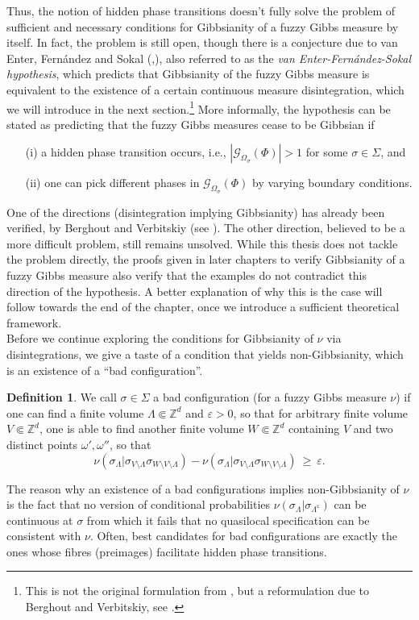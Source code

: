 \documentclass[12pt]{article}
\newcommand{\G}{\mathcal{G}}
\newcommand{\Z}{\mathbb{Z}}
\newcommand{\1}{\mathbbm{1}}
\renewcommand{\c}{\mathsf{c}}
\newcommand{\5}{\vspace{0.5cm}}
\theoremstyle{definition}
\newtheorem{df}[thm]{Definition}
\begin{document}
Thus, the notion of hidden phase transitions doesn't fully solve the problem of sufficient and necessary conditions for Gibbsianity of a fuzzy Gibbs measure by itself. In fact, the problem is still open, though there is a conjecture due to van Enter, Fern\'andez and Sokal (\cite{EFS},\cite{Ber}), also referred to as the \textit{van Enter-Fern\'andez-Sokal hypothesis}, which predicts that Gibbsianity of the fuzzy Gibbs measure is equivalent to the existence of a certain continuous measure disintegration, which we will introduce in the next section.\footnote{This is not the original formulation from \cite{EFS}, but a reformulation due to Berghout and Verbitskiy, see \cite{Ber}.}  More informally, the hypothesis can be stated as predicting that the fuzzy Gibbs measures cease to be Gibbsian if 
\begin{itemize}
	\item[(i)] a hidden phase transition occurs, i.e., $|\G_{\Omega_\sigma}(\Phi)|>1$ for some $\sigma\in\Sigma$, and
	\item[(ii)]  one can pick different phases in $\G_{\Omega_\sigma}(\Phi)$ by varying boundary conditions.
\end{itemize}
One of the directions (disintegration implying Gibbsianity) has already been verified, by Berghout and Verbitskiy (see \cite{Ber}). The other direction, believed to be a more difficult problem, still remains unsolved. While this thesis does not tackle the problem directly, the proofs given in later chapters to verify Gibbsianity of a fuzzy Gibbs measure also verify that the examples do not contradict this direction of the hypothesis. A better explanation of why this is the case will follow towards the end of the chapter, once we introduce a sufficient theoretical framework. \\

Before we continue exploring the conditions for Gibbsianity of $\nu$ via disintegrations, we give a taste of a condition that yields non-Gibbsianity, which is an existence of a ``bad configuration''.

\begin{df}
We call $\sigma\in\Sigma$ a bad configuration (for a fuzzy Gibbs measure $\nu$) if one can find a finite volume $\Lambda\Subset\Z^d$ and $\varepsilon>0$, so that for arbitrary finite volume $V\Subset\Z^d$, one is able to find another finite volume $W\Subset\Z^d$ containing $V$ and two distinct points $\omega',\omega''$, so that
$$\nu(\sigma_\Lambda|\sigma_{V\setminus\Lambda}\sigma_{W\setminus V\setminus\Lambda})-\nu(\sigma_\Lambda|\sigma_{V\setminus\Lambda}\sigma_{W\setminus V\setminus\Lambda}) ~\geq~ \varepsilon.$$
\end{df}
The reason why an existence of a bad configurations implies non-Gibbsianity of $\nu$ is the fact that no version of conditional probabilities $\nu(\sigma_\Lambda|\sigma_{\Lambda^\c})$ can be continuous at $\sigma$ from which it fails that no quasilocal specification can be consistent with $\nu$. Often, best candidates for bad configurations are exactly the ones whose fibres (preimages) facilitate hidden phase transitions.
\end{document}

